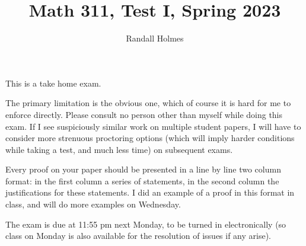 \documentclass[12pt]{article}
\title{Math 311, Test I, Spring 2023}
\author{Randall Holmes}
\begin{document}
\maketitle

This is a take home exam.

The primary limitation is the obvious one, which of course it is hard for me to enforce directly.  Please consult no person other than myself
while doing this exam.  If I see suspiciously similar work on multiple student papers, I will have to consider more strenuous proctoring options (which will imply harder conditions while taking a test, and much less time) on subsequent exams.

Every proof on your paper should be presented in a line by line two column format:  in the first column a series of statements, in the second column the justifications for these statements.  I did an example of a proof in this format in class, and will do more examples on Wednesday.

The exam is due at 11:55 pm  next Monday, to be turned in electronically (so class on Monday is also available for the resolution of issues if any arise).

\newpage
\end{document}
